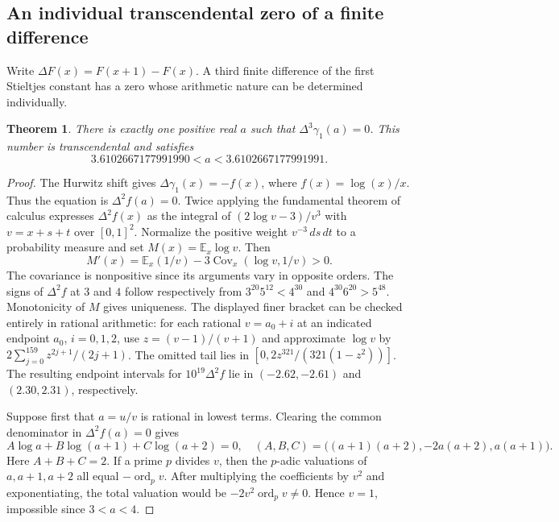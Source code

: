 \documentclass[11pt,a4paper]{article}
\newtheorem{theorem}{Theorem}[section]
\theoremstyle{definition}\newtheorem{definition}[theorem]{Definition}\newtheorem{example}[theorem]{Example}
\theoremstyle{remark}\newtheorem{remark}[theorem]{Remark}
\begin{document}
\subsection{An individual transcendental zero of a finite difference}\label{sec:third-difference}
Write $\Delta F(x)=F(x+1)-F(x)$. A third finite difference of the first Stieltjes constant has a zero whose arithmetic nature can be determined individually.
\begin{theorem}\label{thm:third-difference}
There is exactly one positive real $a$ such that $\Delta^3\gamma_1(a)=0$. This number is transcendental and satisfies
\[
 3.6102667177991990 < a < 3.6102667177991991.
\]
\end{theorem}
\begin{proof}
The Hurwitz shift gives $\Delta\gamma_1(x)=-f(x)$, where $f(x)=\log(x)/x$. Thus the equation is $\Delta^2 f(a)=0$. Twice applying the fundamental theorem of calculus expresses $\Delta^2 f(x)$ as the integral of $(2\log v-3)/v^3$ with $v=x+s+t$ over $[0,1]^2$. Normalize the positive weight $v^{-3}\,ds\,dt$ to a probability measure and set $M(x)=\mathbb E_x\log v$. Then
\[
 M'(x)=\mathbb E_x(1/v)-3\operatorname{Cov}_x(\log v,1/v)>0.
\]
The covariance is nonpositive since its arguments vary in opposite orders. The signs of $\Delta^2 f$ at $3$ and $4$ follow respectively from $3^{20}5^{12}<4^{30}$ and $4^{30}6^{20}>5^{48}$. Monotonicity of $M$ gives uniqueness. The displayed finer bracket can be checked entirely in rational arithmetic: for each rational $v=a_0+i$ at an indicated endpoint $a_0$, $i=0,1,2$, use $z=(v-1)/(v+1)$ and approximate $\log v$ by $2\sum_{j=0}^{159}z^{2j+1}/(2j+1)$. The omitted tail lies in $[0,2z^{321}/(321(1-z^2))]$. The resulting endpoint intervals for $10^{19}\Delta^2 f$ lie in $(-2.62,-2.61)$ and $(2.30,2.31)$, respectively.

Suppose first that $a=u/v$ is rational in lowest terms. Clearing the common denominator in $\Delta^2 f(a)=0$ gives
\[
 A\log a+B\log(a+1)+C\log(a+2)=0,
\quad (A,B,C)=\big((a+1)(a+2),-2a(a+2),a(a+1)\big).
\]
Here $A+B+C=2$. If a prime $p$ divides $v$, then the $p$-adic valuations of $a,a+1,a+2$ all equal $-\operatorname{ord}_p v$. After multiplying the coefficients by $v^2$ and exponentiating, the total valuation would be $-2v^2\operatorname{ord}_p v\ne0$. Hence $v=1$, impossible since $3<a<4$.


\end{proof}
\end{document}
